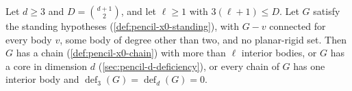 \begin{theorem}
  \label{thm:pencil-d-chain-or-core}
  \leanok
  Let $d \ge 3$ and $D = \binom{d+1}{2}$, and let $\ell \ge 1$ with
  $3(\ell + 1) \le D$. Let $G$ satisfy the standing hypotheses
  (\cref{def:pencil-x0-standing}), with $G - v$ connected for every body
  $v$, some body of degree other than two, and no planar-rigid set. Then
  $G$ has a chain (\cref{def:pencil-x0-chain}) with more than $\ell$
  interior bodies, or $G$ has a core in dimension $d$
  (\cref{sec:pencil-d-deficiency}), or every chain of $G$ has one
  interior body and
  $\operatorname{def}_3(G) = \operatorname{def}_d(G) = 0$.
\end{theorem}
